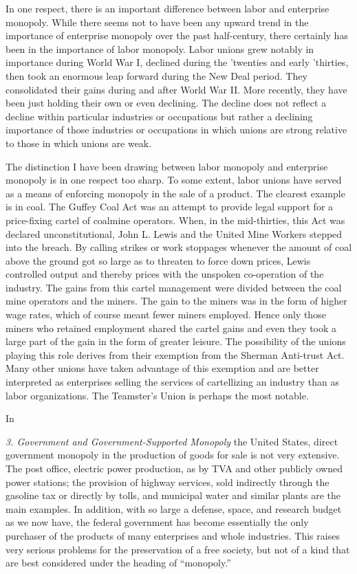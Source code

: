 \documentclass[11pt,openany]{book}
\begin{document}
In one respect, there is an important difference between labor and enterprise monopoly. While there seems not to have been any upward trend in the importance of enterprise monopoly over the past half-century, there certainly has been in the importance of labor monopoly. Labor unions grew notably in importance during World War I, declined during the 'twenties and early 'thirties, then took an enormous leap forward during the New Deal period. They consolidated their gains during and after World War II. More recently, they have been just holding their own or even declining. The decline does not reflect a decline within particular industries or occupations but rather a declining importance of those industries or occupations in which unions are strong relative to those in which unions are weak.

The distinction I have been drawing between labor monopoly and enterprise monopoly is in one respect too sharp. To some extent, labor unions have served as a means of enforcing monopoly in the sale of a product. The clearest example is in coal. The Guffey Coal Act was an attempt to provide legal support for a price-fixing cartel of coalmine operators. When, in the mid-thirties, this Act was declared unconstitutional, John L. Lewis and the United Mine Workers stepped into the breach. By calling strikes or work stoppages whenever the amount of coal above the ground got so large as to threaten to force down prices, Lewis controlled output and thereby prices with the unspoken co-operation of the industry. The gains from this cartel management were divided between the coal mine operators and the miners. The gain to the miners was in the form of higher wage rates, which of course meant fewer miners employed. Hence only those miners who retained employment shared the cartel gains and even they took a large part of the gain in the form of greater leisure. The possibility of the unions playing this role derives from their exemption from the Sherman Anti-trust Act. Many other unions have taken advantage of this exemption and are better interpreted as enterprises selling the services of cartellizing an industry than as labor organizations. The Teamster's Union is perhaps the most notable.

In

\emph{3. Government and Government-Supported Monopoly} the United States, direct government monopoly in the production of goods for sale is not very extensive. The post office, electric power production, as by TVA and other publicly owned power stations; the provision of highway services, sold indirectly through the gasoline tax or directly by tolls, and municipal water and similar plants are the main examples. In addition, with so large a defense, space, and research budget as we now have, the federal government has become essentially the only purchaser of the products of many enterprises and whole industries. This raises very serious problems for the preservation of a free society, but not of a kind that are best considered under the heading of ``monopoly.''
\end{document}
